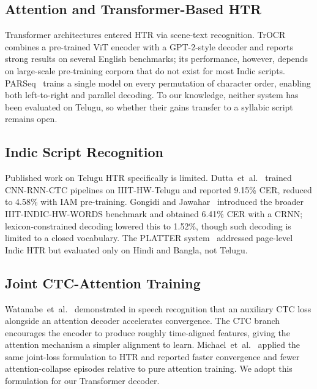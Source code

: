 \documentclass[conference]{IEEEtran}
\begin{document}
\subsection{Attention and Transformer-Based HTR}

Transformer architectures entered HTR via scene-text recognition. TrOCR~\cite{li2023trocr} combines a pre-trained ViT encoder with a GPT-2-style decoder and reports strong results on several English benchmarks; its performance, however, depends on large-scale pre-training corpora that do not exist for most Indic scripts. PARSeq~\cite{bautista2022parseq} trains a single model on every permutation of character order, enabling both left-to-right and parallel decoding. To our knowledge, neither system has been evaluated on Telugu, so whether their gains transfer to a syllabic script remains open.

\subsection{Indic Script Recognition}

Published work on Telugu HTR specifically is limited. Dutta~et~al.~\cite{dutta2018} trained CNN-RNN-CTC pipelines on IIIT-HW-Telugu and reported 9.15\% CER, reduced to 4.58\% with IAM pre-training. Gongidi and Jawahar~\cite{gongidi2021iiit} introduced the broader IIIT-INDIC-HW-WORDS benchmark and obtained 6.41\% CER with a CRNN; lexicon-constrained decoding lowered this to 1.52\%, though such decoding is limited to a closed vocabulary. The PLATTER system~\cite{platter2025} addressed page-level Indic HTR but evaluated only on Hindi and Bangla, not Telugu.

\subsection{Joint CTC-Attention Training}

Watanabe~et~al.~\cite{watanabe2017hybrid} demonstrated in speech recognition that an auxiliary CTC loss alongside an attention decoder accelerates convergence. The CTC branch encourages the encoder to produce roughly time-aligned features, giving the attention mechanism a simpler alignment to learn. Michael~et~al.~\cite{michael2019evaluating} applied the same joint-loss formulation to HTR and reported faster convergence and fewer attention-collapse episodes relative to pure attention training. We adopt this formulation for our Transformer decoder.

\end{document}
